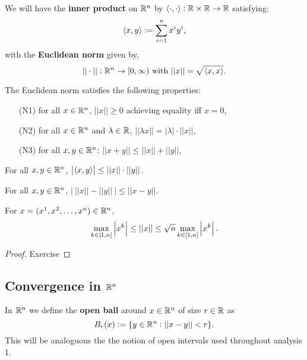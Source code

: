 \documentclass[../Year2.tex]{subfiles}
\begin{document}
\begin{definition}
    We will have the \textbf{inner product} on $\mathbb{R}^n$ by $\left\langle \cdot,\cdot \right\rangle:\mathbb{R}\times\mathbb{R}\rightarrow\mathbb{R}$ satisfying: 
    \[
        \left\langle x,y \right\rangle := \sum_{i=1}^n x^i y^i \text{\textcolor{black}{,}}
    \] with the \textbf{Euclidean norm} given by, \[
        ||\cdot||:\RR^n\rightarrow[0,\infty) \ \black{with } ||x||=\sqrt{\abr{x,x}}\black{.}
    \]
\end{definition}
\vspace{-30pt}

\begin{proposition}
    The Euclidean norm satisfies the following properties: \begin{enumerate}
        \item[(N1)] for all $x\in\mathbb{R}^n$, $||x||\geq 0$ achieving equality iff $x=0$,
        \item[(N2)] for all $x\in\mathbb{R}^n$ and $\lambda\in\mathbb{R}$, $||\lambda x|| = |\lambda|\cdot||x||$,
        \item[(N3)] for all $x,y\in\mathbb{R}^n$: $||x+y||\leq||x||+||y||$,
    \end{enumerate}
\end{proposition}

\begin{theorem}
    For all $x,y\in\mathbb{R}^n$, $\left|\left\langle x,y \right\rangle\right|\leq||x||\cdot||y||$.
\end{theorem}

\begin{theorem}
    For all $x,y\in\mathbb{R}^n$, $\big|\ ||x||-||y||\ \big|\leq||x-y||$.
\end{theorem}

\begin{proposition}
    For $x=(x^1,x^2,\ldots,x^n)\in\mathbb{R}^n$,\[
        \max_{k\in[1,n]}\left|x^k\right|\leq||x||\leq\sqrt{n}\max_{k\in[1,n]}\left|x^k\right|\text{\textcolor{black}{.}}
    \]
    \vspace{-20pt}
    \begin{proof}
        Exercise
    \end{proof}
\end{proposition}

\subsection{Convergence in \texorpdfstring{$\mathbb{R}^n$}{Rn}}

\begin{definition}
    In $\mathbb{R}^n$ we define the \textbf{open ball} around $x\in\mathbb{R}^n$ of size $r\in\mathbb{R}$ as \[
        B_r(x):=\{y\in\mathbb{R}^n:||x-y||<r\}\text{\textcolor{black}{.}}
    \] This will be analoguous the the notion of open intervals used throughout analysis 1.
\end{definition}
\end{document}
